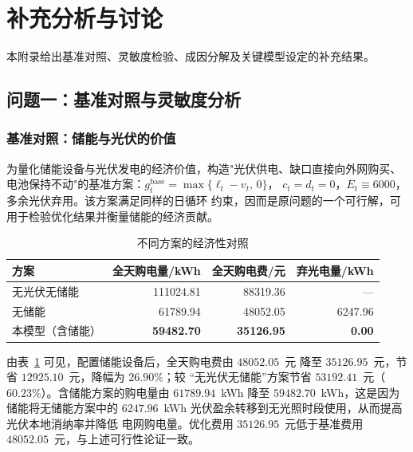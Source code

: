 \newpage
\section{补充分析与讨论}
\label{app:extra}

本附录给出基准对照、灵敏度检验、成因分解及关键模型设定的补充结果。

\subsection{问题一：基准对照与灵敏度分析}

\subsubsection{基准对照：储能与光伏的价值}

为量化储能设备与光伏发电的经济价值，构造"光伏供电、缺口直接向外网购买、
电池保持不动"的基准方案：$g_t^{\mathrm{base}} = \max\{\ell_t - v_t,\,0\}$，
$c_t = d_t = 0$，$E_t \equiv 6000$，多余光伏弃用。该方案满足同样的日循环
约束，因而是原问题的一个可行解，可用于检验优化结果并衡量储能的经济贡献。

\begin{table}[htbp]
  \centering
  \caption{不同方案的经济性对照}
  \label{tab:p1-benchmark}
  \begin{tabular}{lrrr}
    \toprule
    方案 & 全天购电量/kWh & 全天购电费/元 & 弃光电量/kWh \\
    \midrule
    无光伏无储能 & 111024.81 & 88319.36 & --- \\
    无储能       & 61789.94  & 48052.05 & 6247.96 \\
    本模型（含储能） & \textbf{59482.70} & \textbf{35126.95} & \textbf{0.00} \\
    \bottomrule
  \end{tabular}
\end{table}

由表~\ref{tab:p1-benchmark} 可见，配置储能设备后，全天购电费由 $48052.05$~元
降至 $35126.95$~元，节省 $12925.10$~元，降幅为 $26.90\%$；较
“无光伏无储能”方案节省 $53192.41$~元（$60.23\%$）。含储能方案的购电量由
$61789.94$~kWh 降至 $59482.70$~kWh，这是因为储能将无储能方案中的
$6247.96$~kWh 光伏盈余转移到无光照时段使用，从而提高光伏本地消纳率并降低
电网购电量。优化费用 $35126.95$~元低于基准费用
$48052.05$~元，与上述可行性论证一致。

